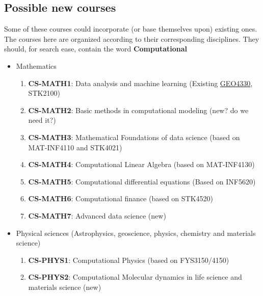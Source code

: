 \documentclass[%
oneside,                 %
final,                   %
10pt]{article}
\begin{document}
\noindent



\subsection*{Possible new courses}
Some of these courses could incorporate (or base themselves upon) existing ones. The courses here are organized according to their corresponding disciplines. They should, for search ease, contain the word \textbf{Computational} 
\begin{itemize}
\item Mathematics
\begin{enumerate}

\item \textbf{CS-MATH1}: Data analysis and machine learning (Existing \href{{http://www.uio.no/studier/emner/matnat/geofag/GEO4330/}}{GEO4330}, STK2100)

\item \textbf{CS-MATH2}: Basic methods in computational modeling   (new? do we need it?)

\item \textbf{CS-MATH3}: Mathematical Foundations of data science (based on MAT-INF4110 and STK4021)

\item \textbf{CS-MATH4}: Computational Linear Algebra (based on MAT-INF4130)

\item \textbf{CS-MATH5}: Computational differential equations (Based on INF5620)

\item \textbf{CS-MATH6}: Computational finance (based on STK4520)

\item \textbf{CS-MATH7}: Advanced data science (new)

\end{enumerate}

\noindent
\item Physical sciences (Astrophysics, geoscience, physics, chemistry and materials science)
\begin{enumerate}

\item \textbf{CS-PHYS1}: Computational Physics (based on FYS3150/4150)

\item \textbf{CS-PHYS2}: Computational Molecular dynamics in life science and materials science (new)


\end{enumerate}
\end{itemize}
\end{document}
